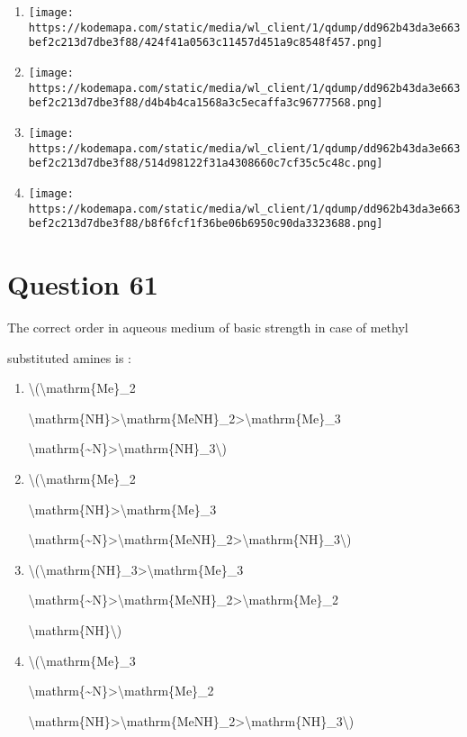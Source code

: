 \documentclass{article}
\begin{document}
\begin{enumerate}[label=(\alph*)]
\item \texttt{[image: https://kodemapa.com/static/media/wl\_client/1/qdump/dd962b43da3e663bef2c213d7dbe3f88/424f41a0563c11457d451a9c8548f457.png]}


\item \texttt{[image: https://kodemapa.com/static/media/wl\_client/1/qdump/dd962b43da3e663bef2c213d7dbe3f88/d4b4b4ca1568a3c5ecaffa3c96777568.png]}


\item \texttt{[image: https://kodemapa.com/static/media/wl\_client/1/qdump/dd962b43da3e663bef2c213d7dbe3f88/514d98122f31a4308660c7cf35c5c48c.png]}


\item \texttt{[image: https://kodemapa.com/static/media/wl\_client/1/qdump/dd962b43da3e663bef2c213d7dbe3f88/b8f6fcf1f36be06b6950c90da3323688.png]}


\end{enumerate}
\newpage
\section*{Question 61}
The correct order in aqueous medium of basic strength in case of methyl

substituted amines is :


\begin{enumerate}[label=(\alph*)]
\item \textbackslash(\textbackslash mathrm\{Me\}\_2

\textbackslash mathrm\{NH\}\textgreater\textbackslash mathrm\{MeNH\}\_2\textgreater\textbackslash mathrm\{Me\}\_3

\textbackslash mathrm\{\textasciitilde N\}\textgreater\textbackslash mathrm\{NH\}\_3\textbackslash)


\item \textbackslash(\textbackslash mathrm\{Me\}\_2

\textbackslash mathrm\{NH\}\textgreater\textbackslash mathrm\{Me\}\_3

\textbackslash mathrm\{\textasciitilde N\}\textgreater\textbackslash mathrm\{MeNH\}\_2\textgreater\textbackslash mathrm\{NH\}\_3\textbackslash)


\item \textbackslash(\textbackslash mathrm\{NH\}\_3\textgreater\textbackslash mathrm\{Me\}\_3

\textbackslash mathrm\{\textasciitilde N\}\textgreater\textbackslash mathrm\{MeNH\}\_2\textgreater\textbackslash mathrm\{Me\}\_2

\textbackslash mathrm\{NH\}\textbackslash)


\item \textbackslash(\textbackslash mathrm\{Me\}\_3

\textbackslash mathrm\{\textasciitilde N\}\textgreater\textbackslash mathrm\{Me\}\_2

\textbackslash mathrm\{NH\}\textgreater\textbackslash mathrm\{MeNH\}\_2\textgreater\textbackslash mathrm\{NH\}\_3\textbackslash)


\end{enumerate}
\newpage
\end{document}
